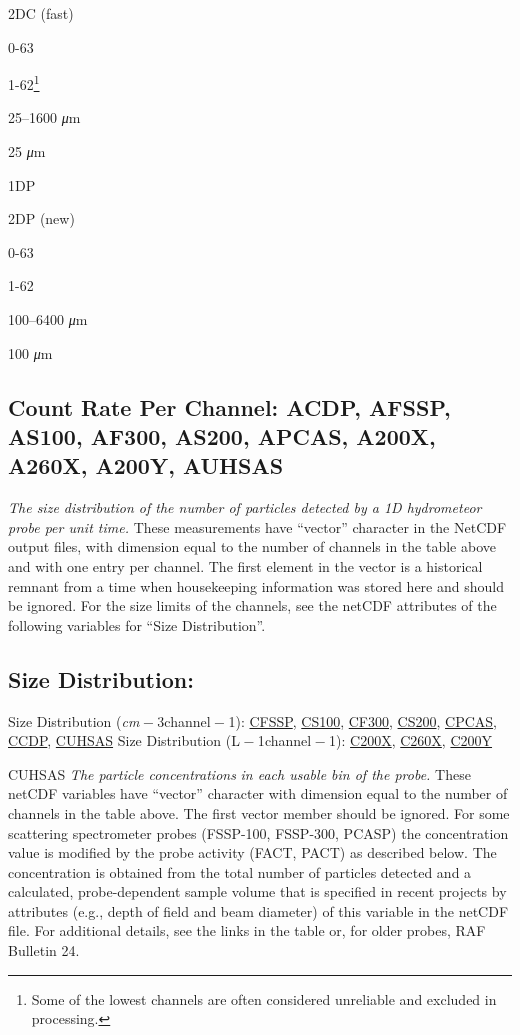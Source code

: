 \documentclass[
  english,
]{book}
\begin{document}
2DC (fast)

0-63

1-62\footnote{Some of the lowest channels are often considered
  unreliable and excluded in processing.}

25--1600 {\emph{μ}}m

25 {\emph{μ}}m

1DP

2DP (new)

0-63

1-62

100--6400 {\emph{μ}}m

100 {\emph{μ}}m

\hypertarget{CRPC}{%
\subsection*{Count Rate Per Channel: ACDP, AFSSP, AS100, AF300, AS200,
APCAS, A200X, A260X, A200Y, AUHSAS}\label{CRPC}}

\emph{The size distribution of the number of particles detected by a 1D
hydrometeor probe per unit time.} These measurements have ``vector''
character in the NetCDF output files, with dimension equal to the number
of channels in the table above and with one entry per channel. The first
element in the vector is a historical remnant from a time when
housekeeping information was stored here and should be ignored. For the
size limits of the channels, see the netCDF attributes of the following
variables for ``Size Distribution''.

\underline{}

\hypertarget{size-distribution}{%
\subsection*{Size Distribution:}\label{size-distribution}}

Size Distribution ({\emph{cm} − 3}channel{ − 1}): \underline{CFSSP},
\underline{CS100}, \underline{CF300}, \underline{CS200},
\underline{CPCAS}, \underline{CCDP}, \underline{CUHSAS} Size
Distribution (L{ − 1}channel{ − 1}): \underline{C200X},
\underline{C260X}, \underline{C200Y}

\protect\hypertarget{CUHSAS}{}{CUHSAS} \emph{The particle
concentrations} \emph{in each usable bin of the probe.} These netCDF
variables have ``vector'' character with dimension equal to the number
of channels in the table above. The first vector member should be
ignored. For some scattering spectrometer probes (FSSP-100, FSSP-300,
PCASP) the concentration value is modified by the probe activity (FACT,
PACT) as described below. The concentration is obtained from the total
number of particles detected and a calculated, probe-dependent sample
volume that is specified in recent projects by attributes (e.g., depth
of field and beam diameter) of this variable in the netCDF file. For
additional details, see the links in the table or, for older probes, RAF
Bulletin 24.
\end{document}
